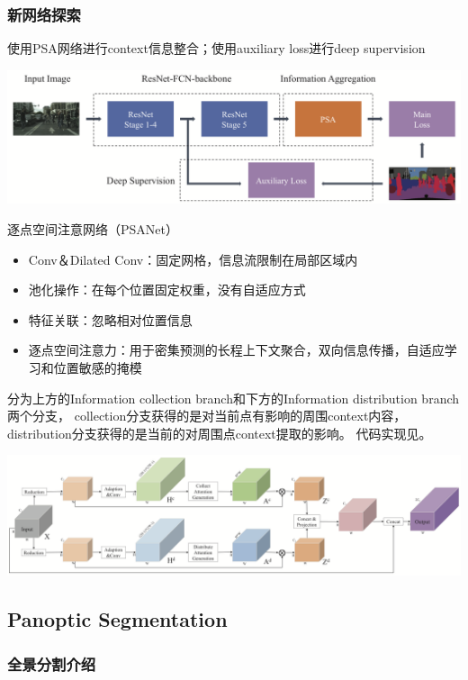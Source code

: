 \documentclass[UTF8, a4paper]{ctexart}
\begin{document}
\subsubsection{新网络探索}

使用PSA网络进行context信息整合；使用auxiliary loss进行deep supervision

{\includegraphics[width=0.95\linewidth]{PSANet-network}}

逐点空间注意网络（PSANet\cite{PSANet}）
\begin{itemize}
    \item Conv＆Dilated Conv：固定网格，信息流限制在局部区域内
    \item 池化操作：在每个位置固定权重，没有自适应方式
    \item 特征关联：忽略相对位置信息
    \item 逐点空间注意力：用于密集预测的长程上下文聚合，双向信息传播，自适应学习和位置敏感的掩模
\end{itemize}
分为上方的Information collection branch和下方的Information distribution branch两个分支，
collection分支获得的是对当前点有影响的周围context内容，distribution分支获得的是当前的对周围点context提取的影响。
代码实现见\cite{semseg_code}。

{\includegraphics[width=0.95\linewidth]{PSANet-module}}

\subsection{Panoptic Segmentation}

\subsubsection{全景分割介绍}
\end{document}
